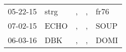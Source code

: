 \begin{supertabular}{p{0.07\textwidth}p{0.06\textwidth}p{0.02\textwidth}p{0.02\textwidth}p{0.06\textwidth}}
 05-22-15\textsuperscript{} &  strg\textsuperscript{} &  , &  , &  fr76\textsuperscript{} \\
 07-02-15\textsuperscript{} &  ECHO\textsuperscript{} &  , &  , &  SOUP\textsuperscript{} \\
 06-03-16\textsuperscript{} &   DBK\textsuperscript{} &  , &  , &  DOMI\textsuperscript{} \\
\end{supertabular}
